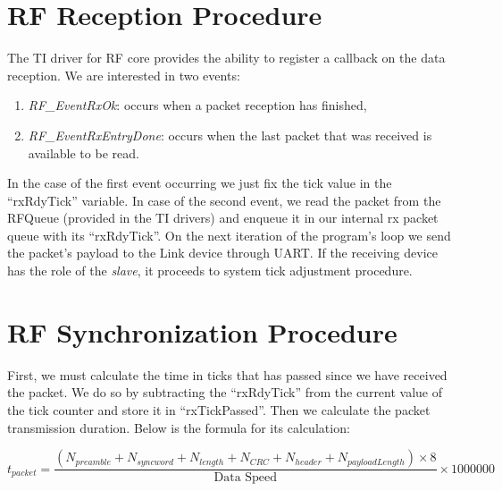 \section{RF Reception Procedure}

The TI driver for RF core provides the ability to register a callback on the data reception. We are interested in two events:
\begin{enumerate}[nolistsep]
    \item \emph{RF\_EventRxOk}: occurs when a packet reception has finished,
    \item \emph{RF\_EventRxEntryDone}: occurs when the last packet that was received is available to be read.
\end{enumerate}

In the case of the first event occurring we just fix the tick value in the “rxRdyTick” variable. In case of the second event, we read the packet from the RFQueue (provided in the TI drivers) and enqueue it in our internal rx packet queue with its “rxRdyTick”. On the next iteration of the program’s loop we send the packet’s payload to the Link device through UART. If the receiving device has the role of the \emph{slave}, it proceeds to system tick adjustment procedure.

\section{RF Synchronization Procedure}

First, we must calculate the time in ticks that has passed since we have received the packet. We do so by subtracting the “rxRdyTick” from the current value of the tick counter and store it in “rxTickPassed”. Then we calculate the packet transmission duration. Below is the formula for its calculation:

\begin{equation}
t_{packet} = \frac{(N_{preamble} + N_{syncword} + N_{length} + N_{CRC} + N_{header} + N_{payloadLength}) \times 8}{\text{Data Speed}} \times 1000000
\end{equation}

